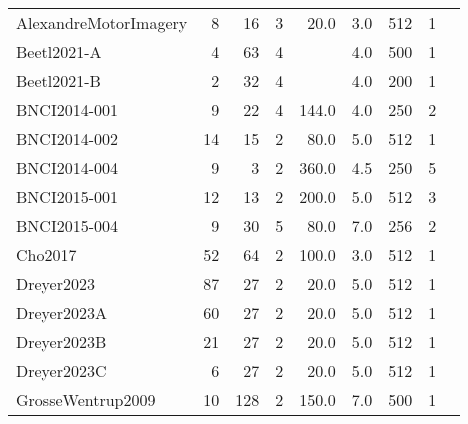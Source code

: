 \begin{tabularx}{\linewidth}{@{}Xrrrrrrrr@{}}
	AlexandreMotorImagery      & 8               & 16       & 3         & 20.0            & 3.0  & 512  & 1                 & \cite{Barachant2012}     \\
	Beetl2021-A                & 4               & 63       & 4         &                 & 4.0  & 500  & 1                 & \cite{Wei2022}           \\
	Beetl2021-B                & 2               & 32       & 4         &                 & 4.0  & 200  & 1                 & \cite{Wei2022}           \\
	BNCI2014-001               & 9               & 22       & 4         & 144.0           & 4.0  & 250  & 2                 & \cite{Tangermann2012}    \\
	BNCI2014-002               & 14              & 15       & 2         & 80.0            & 5.0  & 512  & 1                 & \cite{Steyrl2016}        \\
	BNCI2014-004               & 9               & 3        & 2         & 360.0           & 4.5  & 250  & 5                 & \cite{Leeb2007}          \\
	BNCI2015-001               & 12              & 13       & 2         & 200.0           & 5.0  & 512  & 3                 & \cite{Faller2012}        \\
	BNCI2015-004               & 9               & 30       & 5         & 80.0            & 7.0  & 256  & 2                 & \cite{Scherer2015}       \\
	Cho2017                    & 52              & 64       & 2         & 100.0           & 3.0  & 512  & 1                 & \cite{Cho2017}           \\
	Dreyer2023                 & 87              & 27       & 2         & 20.0            & 5.0  & 512  & 1                 & \cite{Pillette2021}      \\
	Dreyer2023A                & 60              & 27       & 2         & 20.0            & 5.0  & 512  & 1                 & \cite{Pillette2021}      \\
	Dreyer2023B                & 21              & 27       & 2         & 20.0            & 5.0  & 512  & 1                 & \cite{Pillette2021}      \\
	Dreyer2023C                & 6               & 27       & 2         & 20.0            & 5.0  & 512  & 1                 & \cite{Pillette2021}      \\
	GrosseWentrup2009          & 10              & 128      & 2         & 150.0           & 7.0  & 500  & 1                 & \cite{GrosseWentrup2009} \\

\end{tabularx}
